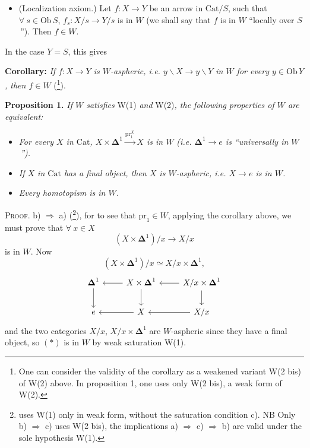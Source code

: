 \documentclass[11pt]{article}
\newcommand{\printedpage}[1]{\marginpar{\footnotesize p.~#1}}
\newcommand{\Cat}{\mathrm{Cat}}
\newcommand{\Dl}{\boldsymbol{\Delta}}
\newcommand{\fl}{\longrightarrow}
\newcommand{\Ob}{\mathrm{Ob}\,}
\newcommand{\pr}{\mathrm{pr}}
\begin{document}
\begin{itemize}[leftmargin=*]
\item[\textbf{W(2)}] (Localization axiom.) Let $f : X \fl Y$ be an arrow in $\Cat/S$, such that $\forall\ s \in \Ob S$, $f_s : X/s \fl Y/s$ is in $W$ (we shall say that $f$ is in $W$ ``locally over $S$\,''). Then $f \in W$.
\end{itemize}



In the case $Y = S$, this gives

\textbf{Corollary:} \textit{If $f : X \fl Y$ is $W$-aspheric, i.e. $y\backslash X \fl y\backslash Y$} \textit{in $W$ for every $y \in \Ob Y$, then $f \in W$} (\footnote{One can consider the validity of the corollary as a weakened variant W(2 bis) of W(2) above. In proposition 1, one uses only W(2 bis), a weak form of W(2).}).

\textbf{Proposition 1.} \textit{If $W$ satisfies} W(1) \textit{and} W(2)\textit{, the following properties of $W$ are equivalent:}

\begin{itemize}[leftmargin=*]
\item[\textit{a)}] \textit{For every $X$ in $\Cat$, $X \times \Dl^1 \xrightarrow{\pr_1^X} X$ is in $W$ (i.e. $\Dl^1 \fl e$ is ``universally in $W$\,'').}

\item[\textit{b)}] \textit{If $X$ in $\Cat$ has a final object, then $X$ is $W$-aspheric, i.e. $X \fl e$ is in $W$.}

\item[\textit{c)}] \textit{Every homotopism is in $W$.}
\end{itemize}

\clearpage

\printedpage{2}

\textsc{Proof.} b) $\Longrightarrow$ a) (\footnote{uses W(1) only in weak form, without the saturation condition c). NB Only b) $\Longrightarrow$ c) uses W(2 bis), the implications a) $\Longrightarrow$ c) $\Longrightarrow$ b) are valid under the sole hypothesis W(1).}), for to see that $\pr_1 \in W$, applying the corollary above, we must prove that $\forall\ x \in X$
\[ (X \times \Dl^1)/x \fl X/x \tag*{$(*)$} \]
is in $W$. Now
\[ (X \times \Dl^1)/x \simeq X/x \times \Dl^1, \]
\[
\begin{tikzcd}
\Dl^1 \arrow[d] & X \times \Dl^1 \arrow[l] \arrow[d] & X/x \times \Dl^1 \arrow[l] \arrow[d] \\
e & X \arrow[l] & X/x \arrow[l]
\end{tikzcd}
\]
 and the two categories $X/x$, $X/x \times \Dl^1$ are $W$-aspheric since they have a final object, so $(*)$ is in $W$ by weak saturation W(1).
\end{document}
